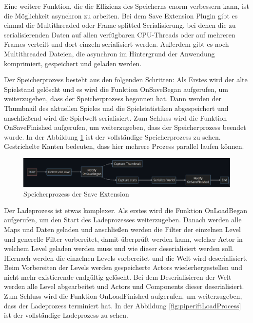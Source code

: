 Eine weitere Funktion, die die Effizienz des Speicherns enorm verbessern kann, ist die Möglichkeit asynchron zu arbeiten. Bei dem Save Extension Plugin gibt es einmal die Multithreaded oder Frame-splitted Serialisierung, bei denen die zu serialisierenden Daten auf allen verfügbaren CPU-Threads oder auf mehreren Frames verteilt und dort einzeln serialisiert werden. Außerdem gibt es noch Multithreaded Dateien, die asynchron im Hintergrund der Anwendung komprimiert, gespeichert und geladen werden.\cite{piperiftPiperiftSaveMultithreaded}

Der Speicherprozess besteht aus den folgenden Schritten: Als Erstes wird der alte Spielstand gelöscht und es wird die Funktion OnSaveBegan aufgerufen, um weiterzugeben, dass der Speicherprozess begonnen hat. Dann werden der Thumbnail des aktuellen Spieles und die Spielstatistiken abgespeichert und anschließend wird die Spielwelt serialisiert. Zum Schluss wird die Funktion OnSaveFinished aufgerufen, um weiterzugeben, dass der Speicherprozess beendet wurde. In der Abbildung \ref{fig:piperiftSaveProcess} ist der vollständige Speicherprozess zu sehen. Gestrichelte Kanten bedeuten, dass hier mehrere Prozess parallel laufen können.\cite{piperiftSaveProcess}

\begin{figure}[htp]
    \centering
    \includegraphics[width=1\textwidth]{images/piperift_save_process.png}
    \caption{Speicherprozess der Save Extension\cite{piperiftSaveProcess}}
    \label{fig:piperiftSaveProcess}
\end{figure}

Der Ladeprozess ist etwas komplexer. Als erstes wird die Funktion OnLoadBegan aufgerufen, um den Start des Ladeprozesses weiterzugeben. Danach werden alle Maps und Daten geladen und anschließen werden die Filter der einzelnen Level und generelle Filter vorbereitet, damit überprüft werden kann, welcher Actor in welchem Level geladen werden muss und wie dieser deserialisiert werden soll. Hiernach werden die einzelnen Levels vorbereitet und die Welt wird deserialisiert. Beim Vorbereiten der Levels werden gespeicherte Actors wiederhergestellen und nicht mehr existierende endgültig gelöscht. Bei dem Deserialisieren der Welt werden alle Level abgearbeitet und Actors und Components dieser deserialisiert. Zum Schluss wird die Funktion OnLoadFinished aufgerufen, um weiterzugeben, dass der Ladeprozess terminiert hat. In der Abbildung \ref{fig:piperiftLoadProcess} ist der vollständige Ladeprozess zu sehen.\cite{piperiftLoadProcess}

